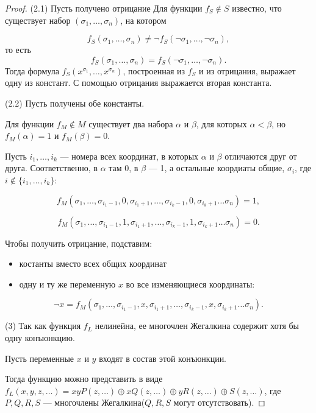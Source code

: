 \begin{proof}
    (2.1) Пусть получено отрицание 
    Для функции $f_S \notin S$ известно, что существует набор $(\sigma_1, \ldots, \sigma_n)$, на котором

    \[f_S(\sigma_1, \ldots, \sigma_n) \neq \neg f_S(\neg\sigma_1, \ldots, \neg\sigma_n),\]
    то есть
    \[f_S(\sigma_1, \ldots, \sigma_n) = f_S(\neg\sigma_1, \ldots, \neg\sigma_n).\]
    Тогда формула $f_S(x^{\sigma_1}, \ldots, x^{\sigma_n})$, построенная из $f_S$ и из отрицания, выражает одну из констант. С помощью отрицания выражается вторая константа.

    (2.2) Пусть получены обе константы.

    Для функции $f_M \notin M$ существует два набора $\alpha$ и $\beta$, для которых $\alpha < \beta$, но $f_M(\alpha) = 1$ и $f_M(\beta) = 0$.

    Пусть $i_1, \ldots, i_k$ --- номера всех координат, в которых $\alpha$ и $\beta$ отличаются друг от друга. Соответственно, в $\alpha$ там 0, в $\beta$ --- 1, а остальные коордиаты общие, $\sigma_i$, где $i \notin \{i_1, \ldots, i_k\}$:

    \[f_M(\sigma_1, \ldots, \sigma_{i_1-1}, 0, \sigma_{i_1+1}, \ldots, \sigma_{i_k-1}, 0, \sigma_{i_k+1} \ldots \sigma_n) = 1,\]

    \[f_M(\sigma_1, \ldots, \sigma_{i_1-1}, 1, \sigma_{i_1+1}, \ldots, \sigma_{i_k-1}, 1, \sigma_{i_k+1} \ldots \sigma_n) = 0.\]
    
    Чтобы получить отрицание, подставим:
    
    \begin{itemize}
        \item костанты вместо всех общих координат
        \item одну и ту же переменную $x$ во все изменяющиеся координаты:
    \end{itemize}
    
    \[ \neg x = f_M(\sigma_1, \ldots, \sigma_{i_1-1}, x, \sigma_{i_1+1}, \ldots, \sigma_{i_k-1}, x, \sigma_{i_k+1} \ldots \sigma_n). \]

    (3) Так как функция $f_L$ нелинейна, ее многочлен Жегалкина содержит хотя бы одну конъюнкцию.

    Пусть переменные $x$ и $y$ входят в состав этой конъюнкции.

    Тогда функцию можно представить в виде $f_L(x, y, z, \ldots) = xyP(z, \ldots) \oplus xQ(z, \ldots) \oplus yR(z, \ldots) \oplus S(z, \ldots)$, где $P, Q, R, S$ --- многочлены Жегалкина($Q, R, S$ могут отсутствовать).


\end{proof}
